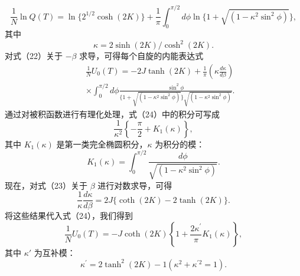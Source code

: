 \begin{equation}\tag{13.1.99}\label{eq:13.1.99}
\frac { 1 } { N } \ln Q ( T ) = \ln \{ 2 ^{1 / 2} \cosh ( 2 K ) \} + \frac { 1 } { \pi } \int _ { 0 } ^{\pi / 2} d \phi \ln \{ 1 + \sqrt { ( 1 - \kappa ^{2} \sin ^{2} \phi ) } \} ,
\end{equation}
其中
\begin{equation}\tag{13.1.100}\label{eq:13.1.100}
\kappa = 2 \sinh ( 2 K ) / \cosh ^{2} ( 2 K ) .
\end{equation}
对式（22）关于 \(-\beta\) 求导，可得每个自旋的内能表达式
\begin{equation}\tag{13.1.101}\label{eq:13.1.101}
\begin{array}{rlr} & { } & { \frac { 1 } { N } U _ { 0 } ( T ) = - 2 J \operatorname { t a n h } ( 2 K ) + \frac { 1 } { \pi } \left( \kappa \frac { d \kappa } { d \beta } \right) } \\& { } & { \times \int _ { 0 } ^{\pi / 2} d \phi \frac { \sin ^{2} \phi } { \{ 1 + \sqrt { ( 1 - \kappa ^{2} \sin ^{2} \phi ) } \} \sqrt { ( 1 - \kappa ^{2} \sin ^{2} \phi ) } } . } \end{array}
\end{equation}
通过对被积函数进行有理化处理，式（24）中的积分可写成
\begin{equation}\tag{13.1.102}\label{eq:13.1.102}
\frac { 1 } { \kappa ^{2} } \left\{ - \frac { \pi } { 2 } + K _ { 1 } ( \kappa ) \right\} ,
\end{equation}
其中 \(K_{1}(\kappa)\) 是第一类完全椭圆积分，\(\kappa\) 为积分的模：
\begin{equation}\tag{13.1.103}\label{eq:13.1.103}
K _ { 1 } ( \kappa ) = \int _ { 0 } ^{\pi / 2} \frac { d \phi } { \sqrt { ( 1 - \kappa ^{2} \sin ^{2} \phi ) } } .
\end{equation}
现在，对式（23）关于 \(\beta\) 进行对数求导，可得
\begin{equation}\tag{13.1.104}\label{eq:13.1.104}
\frac { 1 } { \kappa } \frac { d \kappa } { d \beta } = 2 J \{ \coth ( 2 K ) - 2 \operatorname { t a n h } ( 2 K ) \} .
\end{equation}
将这些结果代入式（24），我们得到
\begin{equation}\tag{13.1.105}\label{eq:13.1.105}
\frac { 1 } { N } U _ { 0 } ( T ) = - J \coth ( 2 K ) \left\{ 1 + \frac { 2 \kappa ^{\prime} } { \pi } K _ { 1 } ( \kappa ) \right\} ,
\end{equation}
其中 \(\kappa'\) 为互补模：
\begin{equation}\tag{13.1.106}\label{eq:13.1.106}
\kappa ^{\prime} = 2 \operatorname { t a n h } ^{2} ( 2 K ) - 1  ( \kappa ^{2} + \kappa ^{\prime 2} = 1 ) .
\end{equation}
